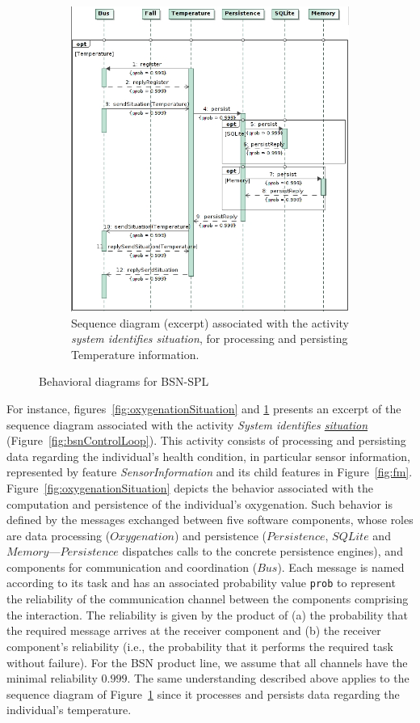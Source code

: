 \begin{figure}[!hbt]
  \begin{subfigure}[c]{0.95\columnwidth}
  \centering
    \includegraphics[width=0.7\columnwidth]{img/sd-temperature}
    \caption{Sequence diagram (excerpt) associated with the activity
	    \textit{system identifies situation}, for processing and persisting
	    Temperature information.} 
    \label{fig:temperatureSituation} 
  \end{subfigure}
  \label{fig:bsnBehavioralDiagrams}
  \vspace{12pt} 
  
  \caption{Behavioral diagrams for BSN-SPL}
\end{figure}

For instance, figures~\ref{fig:oxygenationSituation} and \ref{fig:temperatureSituation} presents an excerpt of the
sequence diagram associated with the activity \emph{System identifies
	\underline{situation}}
(Figure~\ref{fig:bsnControlLoop}). This activity consists of processing and
persisting data regarding the individual's health condition, in particular
sensor information, represented by feature \textit{SensorInformation} and its
child features in Figure~\ref{fig:fm}.  Figure~\ref{fig:oxygenationSituation}
depicts the behavior associated with the computation and persistence of the
individual's oxygenation. Such behavior is defined by the messages exchanged
between five software components, whose roles are data processing
($Oxygenation$) and persistence ($Persistence$, $SQLite$ and
$Memory$---$Persistence$ dispatches calls to the concrete persistence engines),
and components for communication and coordination ($Bus$). Each message is named
according to its task and has an associated probability value \texttt{prob} to
represent the reliability of the communication channel between the components
comprising the interaction. The reliability is given by the product of (a) the
probability that the required message arrives at the receiver component and (b)
the receiver component's reliability (i.e., the probability that it performs the
required task without failure).  For the BSN product line, we assume that all
channels have the minimal reliability $0.999$. The same understanding described above applies to the sequence diagram of Figure~\ref{fig:temperatureSituation} since it processes and persists data regarding the individual's temperature.

